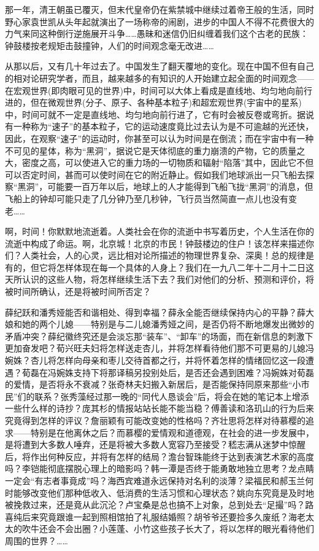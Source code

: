 \par 那一年，清王朝虽已覆灭，但末代皇帝仍在紫禁城中继续过着帝王般的生活，同时野心家袁世凯从头年起就演出了一场称帝的闹剧，进步的中国人不得不花费很大的力气来同这种倒行逆施展开斗争……愚昧和迷信仍旧纠缠着我们这个古老的民族：钟鼓楼按老规矩击鼓撞钟，人们的时间观念毫无改进……
\par 从那以后，又有几十年过去了。中国发生了翻天覆地的变化。现在中国不但有自己的相对论研究学者，而且，越来越多的有知识的人开始建立起全面的时间观念——在宏观世界(即肉眼可见的世界)中，时间可以大体上看成是直线地、均匀地向前行进的，但在微观世界(分子、原子、各种基本粒子)和超宏观世界(宇宙中的星系)中，时间可就不一定是直线地、均匀地向前行进了，它有时会被反卷或弯折。据说有一种称为“速子”的基本粒子，它的运动速度竟比过去认为是不可逾越的光还快，因此，在观察“速子”的运动时，你甚至可以认为时间是在倒流；而在宇宙中有一种不可见的星体，称为“黑洞”，据说它是天体彻底的重力崩溃的产物，它的质量之大，密度之高，可以使进入它的重力场的一切物质和辐射“陷落”其中，因此它不但可以否定时间，甚而可以使时间在它的附近静止。假如我们地球派出一只飞船去探察“黑洞”，可能要一百万年以后，地球上的人才能得到飞船飞拢“黑洞”的消息，但飞船上的钟却可能只走了几分钟乃至几秒钟，飞行员当然简直一点儿也没有变老……
\par 啊，时间！你默默地流逝着。人类社会在你的流逝中书写着历史，个人生活在你的流逝中构成了命运。啊，北京城！北京的市民！钟鼓楼边的住户！该怎样来描述你们？人类社会，人的心灵，远比相对论所描述的物理世界复杂、深奥！总的规律是有的，但它将怎样体现在每一个具体的人身上？我们在一九八二年十二月十二日这天所认识的这些人物，将怎样继续生活下去？我们对他们的分析、预测和评价，将被时间所确认，还是将被时间所否定？
\par 薛纪跃和潘秀娅能否和谐相处、得到幸福？薛永全能否继续保持内心的平静？薛大娘和她的两个儿媳——特别是与二儿媳潘秀娅之间，是否仍将不断地爆发出微妙的矛盾冲突？薛纪徽终究还是会淡忘那“装车”、“卸车”的场面，而在新信息的刺激下更加奋发吧？荀兴旺夫妇将怎样送走杏儿，并将怎样看待他们那不可更易的儿媳冯婉姝？杏儿将怎样向母亲和枣儿交待首都之行，并将怀着怎样的情绪回忆这一段遭遇？荀磊在冯婉姝支持下将那译稿另投别处后，是否还会遇到困难？冯婉姝对荀磊的爱情，是否将永不衰减？张奇林夫妇搬入新居后，是否能保持同原来那些“小市民”们的联系？张秀藻经过那一晚的“同代人恳谈会”后，将会在她的笔记本上增添一些什么样的诗抄？庞其杉的情报站站长能不能当稳？傅善读和洛玑山的行为后来究竟得到怎样的评议？詹丽颖有可能改变她的性格吗？齐壮思将怎样对待慕樱的追求——特别是在他离休之后？而慕樱的爱情观和道德观，在社会的进一步发展中，是将遭到大多数人唾弃，还是将被大多数人宽容乃至接受？嵇志满从迷梦中惊醒后，将作出何种反应，并将有怎样的结局？澹台智珠能终于达到表演艺术家的高度吗？李铠能彻底摆脱心理上的暗影吗？韩一潭是否终于能勇敢地独立思考？龙点睛一定会“有志者事竟成”吗？海西宾难道永远保持对名利的淡薄？梁福民和郝玉兰何时能够改变他们那种低收入、低消费的生活习惯和心理状态？姚向东究竟是及时地被挽救过来，还是竟从此沉沦？卢宝桑是总也搞不上对象，总到处去“足撮”吗？路喜纯后来究竟跟谁一起到照相馆拍了礼服结婚照？胡爷爷还要捡多久废纸？海老太太的吹牛还会不会出圈？小莲蓬、小竹这些孩子长大了，将以怎样的眼光看待他们周围的世界？……
